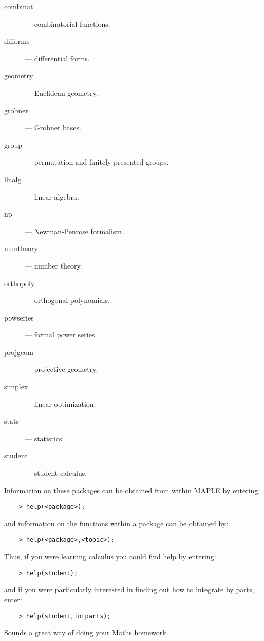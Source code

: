\begin{description}
\begin{description}

\item [combinat] --- combinatorial functions.
\item [difforms] --- differential forms.
\item [geometry] --- Euclidean geometry.
\item [grobner] --- Grobner bases.
\item [group] --- permutation and finitely-presented groups.
\item [linalg] --- linear algebra.
\item [np] --- Newman-Penrose formalism.
\item [numtheory] --- number theory.
\item [orthopoly] --- orthogonal polynomials.
\item [powseries] --- formal power series.
\item [projgeom] --- projective geometry.
\item [simplex] --- linear optimization.
\item [stats] --- statistics.
\item [student] --- student calculus.

\end{description}
\end{description}

Information on these packages can be obtained from within MAPLE by
entering:

\begin{verbatim}
    > help(<package>);
\end{verbatim}

and information on the functions within a package can be obtained by:

\begin{verbatim}
    > help(<package>,<topic>);
\end{verbatim}

Thus, if you were learning calculus you could find help by entering:

\begin{verbatim}
    > help(student);
\end{verbatim}

and if you were particularly interested in finding out how to integrate
by parts, enter:

\begin{verbatim}
    > help(student,intparts);
\end{verbatim}

Sounds a great way of doing your Maths homework.



